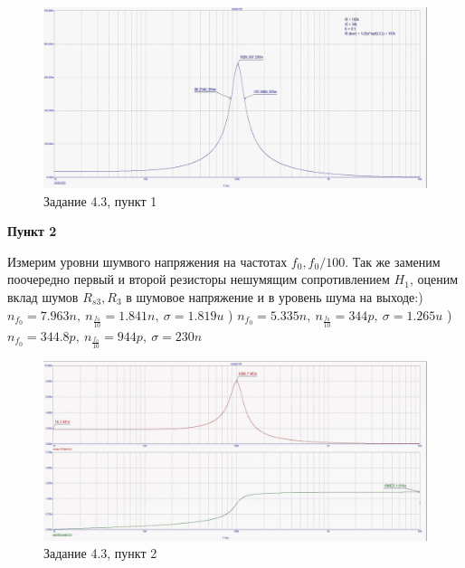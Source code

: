 \documentclass[a4paper, 14pt]{extarticle}%
\begin{document}
\begin{figure}[h!]
			\centering
			\includegraphics[width=1.1\linewidth]{4/4_3_2.jpg}
			\caption{Задание 4.3, пункт 1}
			\label{A}
\end{figure}


\textbf{Пункт 2}
\newline

Измерим уровни шумвого напряжения на частотах $f_0, f_0/100$. Так же заменим поочередно первый и второй резисторы нешумящим сопротивлением $H_1$, оценим вклад шумов $R_{s3}, R_3$ в шумовое напряжение и в уровень шума на выходе:) $n_{f_0} = 7.963n, \: n_{\frac{f_0}{10}} = 1.841n, \: \sigma = 1.819u$
) $n_{f_0} = 5.335n, \: n_{\frac{f_0}{10}} = 344p, \: \sigma = 1.265u$
) $n_{f_0} = 344.8p, \: n_{\frac{f_0}{10}} = 944p, \: \sigma = 230n$
 
\begin{figure}[h!]
			\centering
			\includegraphics[width=1.1\linewidth]{4/4_3_3.jpg}
			\caption{Задание 4.3, пункт 2}
			\label{A}
\end{figure}
\end{document}
